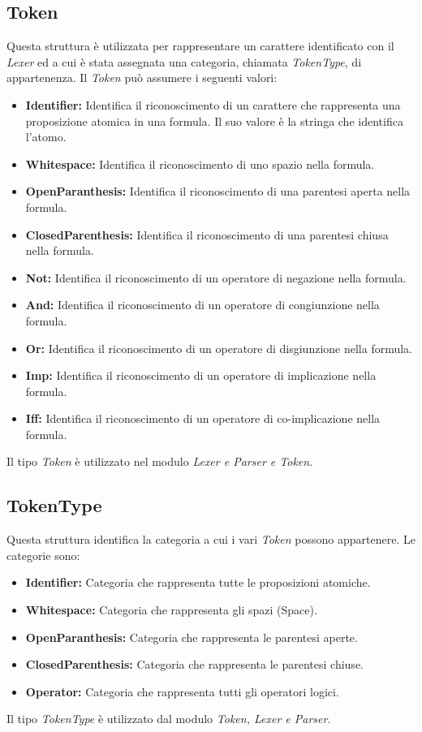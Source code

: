 \documentclass[\main/tesi.tex]{subfiles}
\begin{document}
\subsection{Token}
Questa struttura è utilizzata per rappresentare un carattere identificato con il \textit{Lexer} ed a cui è stata assegnata una categoria, chiamata \textit{TokenType}, di appartenenza. Il \textit{Token} può assumere i seguenti valori:
\begin{itemize}
    \item \textbf{Identifier:} Identifica il riconoscimento di un carattere che rappresenta una proposizione atomica in una formula. Il suo valore è la stringa che identifica l'atomo.
    \item \textbf{Whitespace:} Identifica il riconoscimento di uno spazio nella formula.
    \item \textbf{OpenParanthesis:} Identifica il riconoscimento di una parentesi aperta nella formula.
    \item \textbf{ClosedParenthesis:} Identifica il riconoscimento di una parentesi chiusa nella formula.
    \item \textbf{Not:} Identifica il riconoscimento di un operatore di negazione nella formula.
    \item \textbf{And:} Identifica il riconoscimento di un operatore di congiunzione nella formula.
    \item \textbf{Or:} Identifica il riconoscimento di un operatore di disgiunzione nella formula.
    \item \textbf{Imp:} Identifica il riconoscimento di un operatore di implicazione nella formula.
    \item \textbf{Iff:} Identifica il riconoscimento di un operatore di co-implicazione nella formula.
\end{itemize}
Il tipo \textit{Token} è utilizzato nel modulo \textit{Lexer e Parser e Token}.

\subsection{TokenType}
Questa struttura identifica la categoria a cui i vari \textit{Token} possono appartenere. Le categorie sono:
\begin{itemize}
    \item \textbf{Identifier:} Categoria che rappresenta tutte le proposizioni atomiche.
    \item \textbf{Whitespace:} Categoria che rappresenta gli spazi (Space).
    \item \textbf{OpenParanthesis:} Categoria che rappresenta le parentesi aperte.
    \item \textbf{ClosedParenthesis:} Categoria che rappresenta le parentesi chiuse.
    \item \textbf{Operator:} Categoria che rappresenta tutti gli operatori logici.
\end{itemize}
Il tipo \textit{TokenType} è utilizzato dal modulo \textit{Token, Lexer e Parser}.
\end{document}

